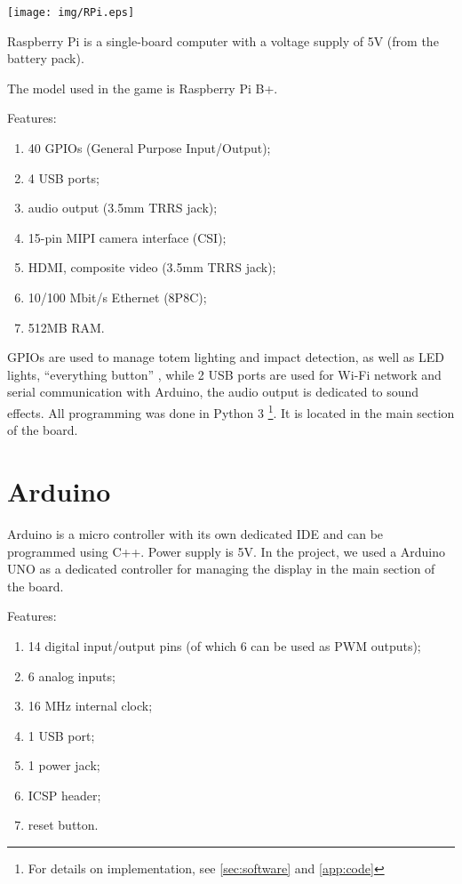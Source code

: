 \documentclass[a4paper,twoside]{book}
\begin{document}
\begin{appendices}
\texttt{[image: img/RPi.eps]}

Raspberry Pi is a single-board computer with a voltage supply of 5V (from the battery pack).

The model used in the game is Raspberry Pi B+.

\beforelist Features:
\begin{enumerate}
\item 40 GPIOs (General Purpose Input/Output);
\item 4 USB ports;
\item audio output (3.5mm TRRS jack);
\item 15-pin MIPI camera interface (CSI);
\item HDMI, composite video (3.5mm TRRS jack);
\item 10/100 Mbit/s Ethernet (8P8C);
\item 512MB RAM.
\end{enumerate}
\afterlist*
GPIOs are used to manage totem lighting and impact detection, as well as  LED lights, \textquotedblleft{}everything button\textquotedblright{} , while 2 USB ports are used for Wi-Fi network and serial communication with Arduino, the audio output is dedicated to sound effects. All programming was done in Python 3%
\footnote {For details on implementation, see \autoref{sec:software} and \autoref{app:code}}.
It is located in the main section of the board.

\section{Arduino}
\label{app:Arduino}
Arduino is a micro controller with its own dedicated IDE and can be programmed using C++. Power supply is 5V. In the project, we used a Arduino UNO as a dedicated controller for managing the display in the main section of the board. 

\beforelist Features:
\begin{enumerate}
\item 14 digital input/output pins (of which 6 can be used as PWM outputs);
\item 6 analog inputs;
\item 16 MHz internal clock;
\item 1 USB port;
\item 1 power jack;
\item ICSP header;
\item reset button.
\end{enumerate} 
\afterlist*


\end{appendices}
\end{document}
